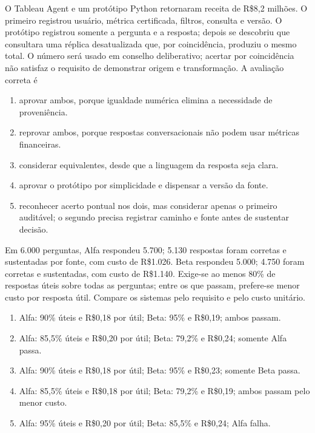 \TextoBase
O Tableau Agent e um protótipo Python retornaram receita de R\$8,2 milhões. O primeiro registrou usuário, métrica certificada, filtros, consulta e versão. O protótipo registrou somente a pergunta e a resposta; depois se descobriu que consultara uma réplica desatualizada que, por coincidência, produziu o mesmo total.
O número será usado em conselho deliberativo; acertar por coincidência não satisfaz o requisito de demonstrar origem e transformação.
\FonteDidatica
\Comando A avaliação correta é
\begin{enumerate}[label=\Alph*)]
\item aprovar ambos, porque igualdade numérica elimina a necessidade de proveniência.
\item reprovar ambos, porque respostas conversacionais não podem usar métricas financeiras.
\item considerar equivalentes, desde que a linguagem da resposta seja clara.
\item aprovar o protótipo por simplicidade e dispensar a versão da fonte.
\item reconhecer acerto pontual nos dois, mas considerar apenas o primeiro auditável; o segundo precisa registrar caminho e fonte antes de sustentar decisão.
\end{enumerate}

\TextoBase
Em 6.000 perguntas, Alfa respondeu 5.700; 5.130 respostas foram corretas e sustentadas por fonte, com custo de R\$1.026. Beta respondeu 5.000; 4.750 foram corretas e sustentadas, com custo de R\$1.140. Exige-se ao menos 80\% de respostas úteis sobre todas as perguntas; entre os que passam, prefere-se menor custo por resposta útil.
\FonteDidatica
\Comando Compare os sistemas pelo requisito e pelo custo unitário.
\begin{enumerate}[label=\Alph*)]
\item Alfa: 90\% úteis e R\$0,18 por útil; Beta: 95\% e R\$0,19; ambos passam.
\item Alfa: 85,5\% úteis e R\$0,20 por útil; Beta: 79,2\% e R\$0,24; somente Alfa passa.
\item Alfa: 90\% úteis e R\$0,18 por útil; Beta: 95\% e R\$0,23; somente Beta passa.
\item Alfa: 85,5\% úteis e R\$0,18 por útil; Beta: 79,2\% e R\$0,19; ambos passam pelo menor custo.
\item Alfa: 95\% úteis e R\$0,20 por útil; Beta: 85,5\% e R\$0,24; Alfa falha.
\end{enumerate}

